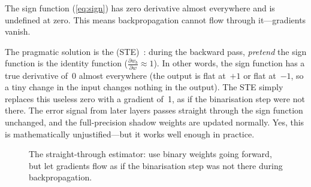 The sign function (\cref{eq:sign}) has zero derivative almost
everywhere and is undefined at zero. This means backpropagation
cannot flow through it---gradients vanish.

The pragmatic solution is the 
(STE)~\cite{bengio2013ste}: during the backward pass, \emph{pretend}
the sign function is the identity function ($\frac{\partial w_b}
{\partial w} \approx 1$). In other words, the sign function has a
true derivative of~0 almost everywhere (the output is flat at~$+1$ or
flat at~$-1$, so a tiny change in the input changes nothing in the
output). The STE simply replaces this useless zero with a gradient
of~1, as if the binarisation step were not there. The error signal
from later layers passes straight through the sign function unchanged,
and the full-precision shadow weights are updated normally. Yes, this
is mathematically unjustified---but it works well enough in practice.

\begin{figure}[htbp]
\centering
{}
\caption{The straight-through estimator: use binary weights going
  forward, but let gradients flow as if the binarisation step was not
  there during backpropagation.}
\label{fig:ste}
\end{figure}

